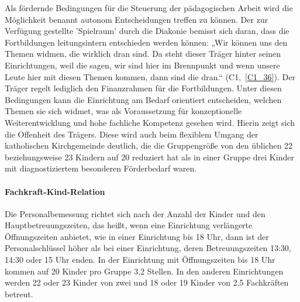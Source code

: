 Als fördernde Bedingungen für die Steuerung der pädagogischen Arbeit wird die Möglichkeit benannt autonom Entscheidungen treffen zu können. 
Der zur Verfügung gestellte 'Spielraum' durch die Diakonie bemisst sich daran, dass die Fortbildungen leitungsintern entschieden werden können: „Wir können uns den Themen widmen, die wirklich dran sind. Da steht dieser Träger hinter seinen Einrichtungen, weil die sagen, wir sind hier im Brennpunkt und wenn unsere Leute hier mit diesen Themen kommen, dann sind die dran.“ (C1,~\ref{C1_36}). Der Träger regelt lediglich den Finanzrahmen für die Fortbildungen. Unter diesen Bedingungen kann die Einrichtung am Bedarf orientiert entscheiden, welchen Themen sie sich widmet, was als Voraussetzung für konzeptionelle Weiterentwicklung und hohe fachliche Kompetenz gesehen wird. 
Hierin zeigt sich die Offenheit des Trägers. Diese wird auch beim flexiblem Umgang der katholischen Kirchgemeinde deutlich, die die Gruppengröße von den üblichen 22 beziehungsweise 23 Kindern auf 20 reduziert hat als in einer Gruppe drei Kinder mit diagnostiziertem besonderen Förderbedarf waren. 

\paragraph{Fachkraft-Kind-Relation}
Die Personalbemessung richtet sich nach der Anzahl der Kinder und den Hauptbetreuungszeiten, das heißt, wenn eine Einrichtung verlängerte Öffnungszeiten anbietet, wie in einer Einrichtung bis 18 Uhr, dann ist der Personalschlüssel höher als bei einer Einrichtung, deren Betreuungszeiten 13:30, 14:30 oder 15 Uhr enden. In der Einrichtung mit Öffnungszeiten bis 18 Uhr kommen auf 20 Kinder pro Gruppe 3,2 Stellen.
In den anderen Einrichtungen werden 22 oder 23 Kinder von zwei und 18 oder 19 Kinder von 2,5 Fachkräften betreut.    

